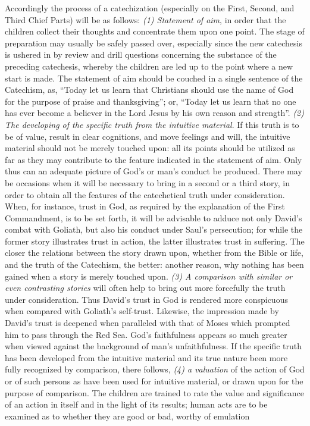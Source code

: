 Accordingly the process of a catechization (especially on the First, Second, and Third Chief Parts) will be as follows: \emph{(1) Statement of aim}, in order that the children collect their thoughts and concentrate them upon one point. The stage of preparation may usually be safely passed over, especially since the new catechesis is ushered in by review and drill questions concerning the substance of the preceding catechesis, whereby the children are led up to the point where a new start is made. The statement of aim should be couched in a single sentence of the Catechism, as, “Today let us learn that Christians should use the name of God for the purpose of praise and thanksgiving”; or, “Today let us learn that no one has ever become a believer in the Lord Jesus by his own reason and strength”. \emph{(2) The developing of the specific truth from the intuitive material}. If this truth
is to be of value, result in clear cognitions, and move feelings and will, the intuitive material should not be merely touched upon: all its points should be utilized as far as they may contribute to the feature indicated in the statement of aim. Only thus can an adequate picture of God’s or man’s conduct be produced. There may be occasions when it will be necessary to bring in a second or a third story, in order to obtain all the features of the catechetical truth under consideration. When, for instance, trust in God, as required by the explanation of the First Commandment, is to be set forth, it will be advisable to adduce not only David’s combat with Goliath, but also his conduct under Saul’s persecution; for while the former story illustrates trust in action, the latter illustrates trust in suffering. The closer the relations between the story drawn upon, whether from the Bible or life, and the truth of the Catechism, the better: another reason, why nothing has been gained when a story is merely touched upon. \emph{(3) A comparison with similar or even contrasting stories} will often help to bring out more forcefully the truth under consideration. Thus David’s trust in God is rendered more conspicuous when compared with Goliath’s self-trust. Likewise, the impression made by David’s trust is deepened when paralleled with that of Moses which prompted him to pass through the Red Sea. God’s faithfulness appears so much greater when viewed against the background of man’s unfaithfulness. If the specific truth has been developed from the intuitive material and its true nature been more fully recognized by comparison, there follows, \emph{(4) a valuation} of the action of God or of such persons as have been used for intuitive material, or drawn upon for the purpose of comparison. The children are trained to rate the value and significance of an action in itself and in the light of its results; human acts are to be examined as to whether they are good or bad, worthy of emulation

